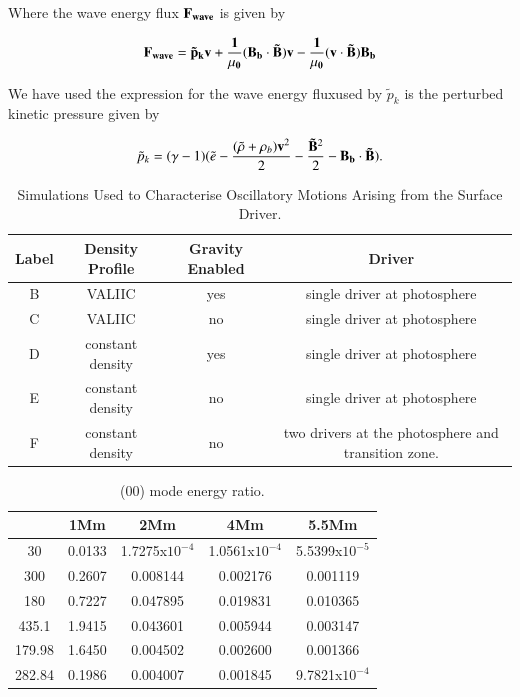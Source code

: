 \documentclass[final,1p]{elsarticle}
\begin{document}
Where the wave energy flux $\bold{F_{wave}}$ is given by

\begin{equation}\label{eqwaveenergyfluxintegral}
\bf{F_{wave}}=\tilde{p}_{k} \bf{v}+\frac{1}{\mu_{0}}(\bf{B_{b}}\cdot \bf{\tilde{B}})\bf{v}-\frac{1}{\mu_{0}}(\bf{v}\cdot\bf{\tilde{B}})\bf{B_{b}}
\end{equation}

We have used the expression for the wave energy fluxused by 
 $\tilde{p}_{k}$ is the perturbed kinetic pressure given by \cite{Bogdan2003}

\begin{equation}\label{eqperturbpk}
\tilde{p}_{k}=(\gamma - 1)( \tilde{e}-{{(\tilde{\rho} +\rho_{b})\bf v }^{2}\over{2}}-  {{\bf \tilde{B}}^{2}\over{2}}-\bf{B_{b}} \cdot  \bf{\tilde{B}}).
\end{equation}




\begin{table}
\centering
\begin{tabular}{c c c c }
\hline
Label   &  Density Profile & Gravity Enabled & Driver\\
\hline
B &  VALIIC & yes & single driver at photosphere & \\
\hline
C & VALIIC & no & single driver at photosphere &  \\
\hline
D & constant density & yes & single driver at photosphere &  \\
\hline
E & constant density & no & single driver at photosphere &  \\
\hline
F & constant density & no & two drivers at the photosphere and transition zone. &  \\
\hline
\end{tabular} 
\caption{Simulations Used to Characterise Oscillatory Motions Arising from the Surface Driver.}
\end{table}





\begin{table}
\centering
\begin{tabular}{c c c c c }
\hline
   &  1Mm & 2Mm & 4Mm & 5.5Mm \\
\hline
30 &  0.0133 & 1.7275x$10^{-4}$ & 1.0561x$10^{-4}$ & 5.5399x$10^{-5}$ \\
\hline
300 & 0.2607 & 0.008144 & 0.002176 &  0.001119 \\
\hline
180 & 0.7227 & 0.047895 & 0.019831 &  0.010365 \\
\hline
435.1 & 1.9415 & 0.043601 & 0.005944 & 0.003147  \\
\hline
179.98 & 1.6450 & 0.004502 & 0.002600&  0.001366 \\ 
\hline
282.84 & 0.1986 & 0.004007 & 0.001845 &  9.7821x$10^{-4}$ \\
\hline
\end{tabular} 
\caption{ (00) mode energy ratio.}
\end{table}
\end{document}
